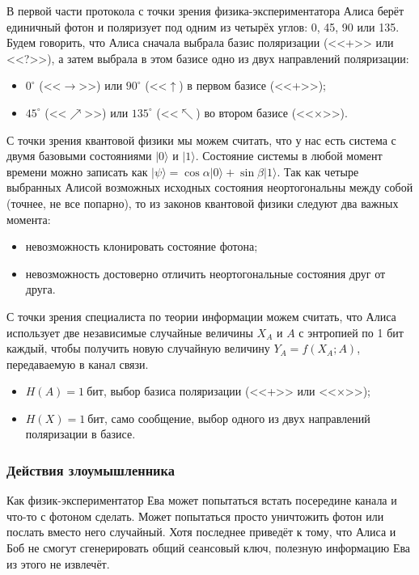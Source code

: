 В первой части протокола с точки зрения физика-экспериментатора Алиса берёт единичный фотон и поляризует под одним из четырёх углов: 0, 45, 90 или 135. Будем говорить, что Алиса сначала выбрала базис поляризации (<<+>> или <<?>>), а затем выбрала в этом базисе одно из двух направлений поляризации:

\begin{itemize}
	\item $0^{\circ}$ (<<$\rightarrow$>>) или $90^{\circ}$ (<<$\uparrow$) в первом базисе (<<+>>);
	\item $45^{\circ}$ (<<$\nearrow$>>) или $135^{\circ}$ (<<$\nwarrow$) во втором базисе (<<×>>).
\end{itemize}

С точки зрения квантовой физики мы можем считать, что у нас есть система с двумя базовыми состояниями $|0\rangle$ и $|1\rangle$. Состояние системы в любой момент времени можно записать как $| \psi \rangle = \cos \alpha |0\rangle + \sin \beta |1\rangle$. Так как четыре выбранных Алисой возможных исходных состояния неортогональны между собой (точнее, не все попарно), то из законов квантовой физики следуют два важных момента:

\begin{itemize}
	\item невозможность клонировать состояние фотона;
	\item невозможность достоверно отличить неортогональные состояния друг от друга.
\end{itemize}

С точки зрения специалиста по теории информации можем считать, что Алиса использует две независимые случайные величины $X_A$ и $A$ с энтропией по 1 бит каждый, чтобы получить новую случайную величину $Y_A = f \left( X_A; A \right)$, передаваемую в канал связи.

\begin{itemize}
	\item $H \left( A \right) = 1~\text{бит}$, выбор базиса поляризации (<<+>> или <<×>>);
	\item $H \left( X \right) = 1~\text{бит}$, само сообщение, выбор одного из двух направлений поляризации в базисе.
\end{itemize}

\subsubsection{Действия злоумышленника}

Как физик-экспериментатор Ева может попытаться встать посередине канала и что-то с фотоном сделать. Может попытаться просто уничтожить фотон или послать вместо него случайный. Хотя последнее приведёт к тому, что Алиса и Боб не смогут сгенерировать общий сеансовый ключ, полезную информацию Ева из этого не извлечёт.

